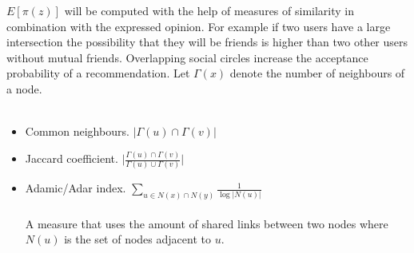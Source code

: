 $E[\pi(z)]$ will be computed with the help of measures of similarity in combination with the expressed opinion. For example if two users have a large intersection the possibility that they will be friends is higher than two other users without mutual friends. Overlapping social circles increase the acceptance probability of a recommendation. Let $\Gamma(x)$ denote the number of neighbours of a node.
\\
\\
 \begin{itemize}
  \item Common neighbours. $ \lvert\Gamma(u) \cap \Gamma(v)\rvert$
  
  \item Jaccard coefficient. $ \lvert\frac{\Gamma(u) \cap \Gamma(v)}{\Gamma(u) \cup \Gamma(v)}\rvert$
  
  \item Adamic/Adar index. $\sum_{u \in N(x) \cap N(y)} \frac{1}{\log |N(u)|}$\\
  \\
A measure that uses the amount of shared links between two nodes where $N(u)$ is the set of nodes adjacent to $u$.
  
\end{itemize}


\clearpage



